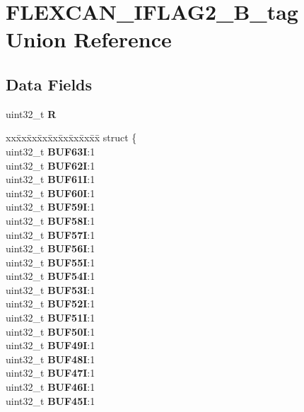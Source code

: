 \hypertarget{unionFLEXCAN__IFLAG2__32B__tag}{}\section{F\+L\+E\+X\+C\+A\+N\+\_\+\+I\+F\+L\+A\+G2\+\_\+B\+\_\+tag Union Reference}
\label{unionFLEXCAN__IFLAG2__32B__tag}
\subsection*{Data Fields}
\begin{DoxyCompactItemize}
\item 
\mbox{\label{unionFLEXCAN__IFLAG2__32B__tag_a9470d0b9b966edf89ef2fed9506d88de}} 
uint32\+\_\+t {\bfseries R}
\item 
\mbox{\label{unionFLEXCAN__IFLAG2__32B__tag_a873d20971133bc3112b710acdd0c1905}} 
\begin{tabbing}
xx\=xx\=xx\=xx\=xx\=xx\=xx\=xx\=xx\=\kill
struct \{\\
\>uint32\_t {\bfseries BUF63I}:1\\
\>uint32\_t {\bfseries BUF62I}:1\\
\>uint32\_t {\bfseries BUF61I}:1\\
\>uint32\_t {\bfseries BUF60I}:1\\
\>uint32\_t {\bfseries BUF59I}:1\\
\>uint32\_t {\bfseries BUF58I}:1\\
\>uint32\_t {\bfseries BUF57I}:1\\
\>uint32\_t {\bfseries BUF56I}:1\\
\>uint32\_t {\bfseries BUF55I}:1\\
\>uint32\_t {\bfseries BUF54I}:1\\
\>uint32\_t {\bfseries BUF53I}:1\\
\>uint32\_t {\bfseries BUF52I}:1\\
\>uint32\_t {\bfseries BUF51I}:1\\
\>uint32\_t {\bfseries BUF50I}:1\\
\>uint32\_t {\bfseries BUF49I}:1\\
\>uint32\_t {\bfseries BUF48I}:1\\
\>uint32\_t {\bfseries BUF47I}:1\\
\>uint32\_t {\bfseries BUF46I}:1\\
\>uint32\_t {\bfseries BUF45I}:1\\

\end{tabbing}
\end{DoxyCompactItemize}
